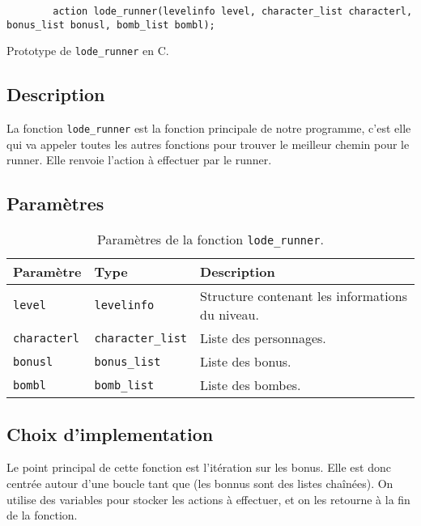 \begin{listing}[!htpb]
    \begin{verbatim}
        action lode_runner(levelinfo level, character_list characterl, bonus_list bonusl, bomb_list bombl);
    \end{verbatim}
    \caption{Prototype de \texttt{lode\_runner} en C.}
    \label{listing:c-lode_runner-prototype}
\end{listing}

\subsection{Description}

La fonction \texttt{lode\_runner} est la fonction principale de notre programme, c'est elle qui va appeler toutes les autres fonctions pour trouver le meilleur chemin pour le runner.
Elle renvoie l'action à effectuer par le runner.

\subsection{Paramètres}

\begin{table}[!htpb]
    \begin{tabularx}{\textwidth}{lXX}
        \toprule
        \textbf{Paramètre} & \textbf{Type} & \textbf{Description} \\
        \midrule
        \texttt{level} & \texttt{levelinfo} & Structure contenant les informations du niveau. \\
        \texttt{characterl} & \texttt{character\_list} & Liste des personnages. \\
        \texttt{bonusl} & \texttt{bonus\_list} & Liste des bonus. \\
        \texttt{bombl} & \texttt{bomb\_list} & Liste des bombes. \\
        \bottomrule
    \end{tabularx}
    \caption{Paramètres de la fonction \texttt{lode\_runner}.}
    \label{tab:parameters-lode_runner}
\end{table}

\subsection{Choix d'implementation}

Le point principal de cette fonction est l'itération sur les bonus.
Elle est donc centrée autour d'une boucle tant que (les bonnus sont des listes chaînées).
On utilise des variables pour stocker les actions à effectuer, et on les retourne à la fin de la fonction.

